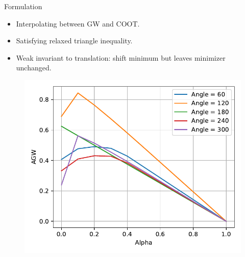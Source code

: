 \documentclass{beamer}
\begin{document}
\begin{frame}{Formulation}
\begin{minipage}[t]{0.55\linewidth}
  \begin{itemize}
    \item Interpolating between GW and COOT.
    \item Satisfying relaxed triangle inequality.
    \item Weak invariant to translation: shift minimum but leaves minimizer unchanged.
  \end{itemize}
  \end{minipage}%
  \hfill%
  \hspace{-6cm}
  \begin{minipage}[t]{0.45\linewidth}
    \vspace{-0.2cm}
  \begin{figure}
    \centering
    \includegraphics[width=1.15\linewidth, keepaspectratio=true]{OT_new/agw_alpha.pdf}
  \end{figure}
  \end{minipage}

\end{frame}
\end{document}
